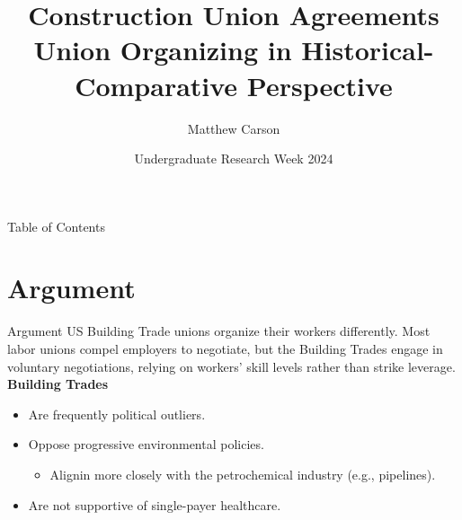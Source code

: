 \documentclass{beamer}
\title[Construction Union\ldots{Historical-Comparative}]{Construction Union Agreements\\
Union Organizing in Historical-Comparative Perspective}
\author{Matthew Carson}
\date[Undergrad. Research Week '24]{Undergraduate Research Week 2024}
\begin{document}
\begin{frame}
  \titlepage
\end{frame}

\begin{frame}{Table of Contents}
  \tableofcontents
\end{frame}

\section{Argument}
\begin{frame}{Argument}
	US Building Trade unions organize their workers differently. Most labor unions compel employers to negotiate, but the Building Trades engage in voluntary negotiations, relying on workers' skill levels rather than strike leverage. 
	\newline\newline
	\textbf{Building Trades}
	\begin{itemize}
		\item Are frequently political outliers.
		\item Oppose progressive environmental policies.
		\begin{itemize}
			\item Alignin more closely with the petrochemical industry (e.g., pipelines).
		\end{itemize}
		\item Are not supportive of single-payer healthcare.
	\end{itemize}
	
\end{frame}
\end{document}
